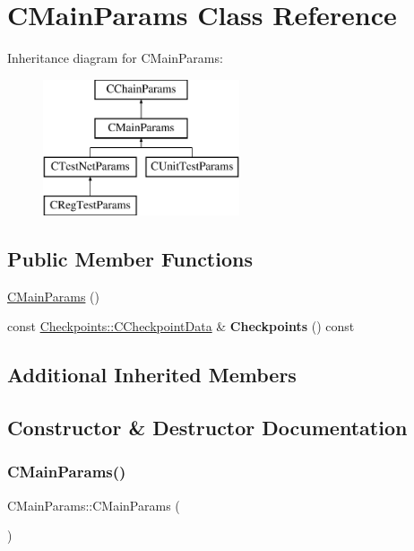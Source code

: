 \hypertarget{class_c_main_params}{}\section{C\+Main\+Params Class Reference}
\label{class_c_main_params}
Inheritance diagram for C\+Main\+Params\+:\begin{figure}[H]
\begin{center}
\leavevmode
\includegraphics[height=4.000000cm]{class_c_main_params}
\end{center}
\end{figure}
\subsection*{Public Member Functions}
\begin{DoxyCompactItemize}
\item 
\mbox{\hyperlink{class_c_main_params_ab7dfebf3c4dd5cc0ebdfabe1111056d6}{C\+Main\+Params}} ()
\item 
\mbox{\label{class_c_main_params_a7c74a76c96714b533ac485e2e9b25f15}} 
const \mbox{\hyperlink{struct_checkpoints_1_1_c_checkpoint_data}{Checkpoints\+::\+C\+Checkpoint\+Data}} \& {\bfseries Checkpoints} () const
\end{DoxyCompactItemize}
\subsection*{Additional Inherited Members}


\subsection{Constructor \& Destructor Documentation}
\mbox{\label{class_c_main_params_ab7dfebf3c4dd5cc0ebdfabe1111056d6}} 
\subsubsection{\texorpdfstring{C\+Main\+Params()}{CMainParams()}}
{\footnotesize\ttfamily C\+Main\+Params\+::\+C\+Main\+Params (\begin{DoxyParamCaption}{ }\end{DoxyParamCaption})\hspace{0.3cm}{\ttfamily [inline]}}

